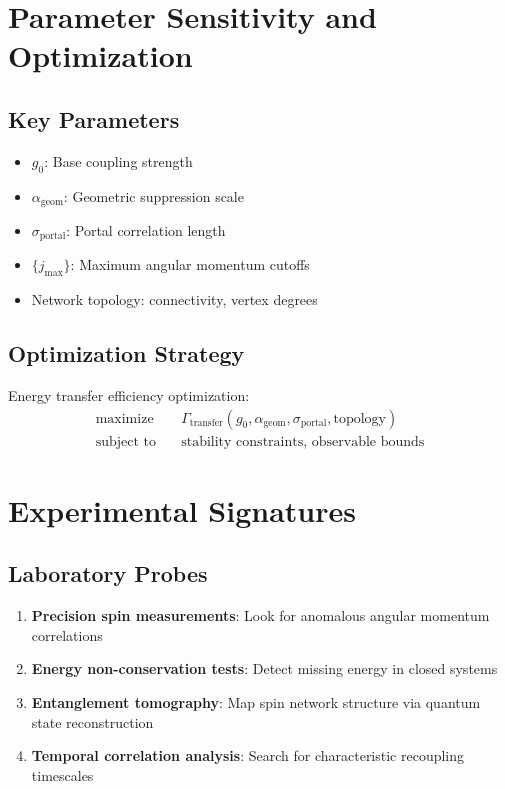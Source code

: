 \documentclass{article}
\begin{document}
\section{Parameter Sensitivity and Optimization}

\subsection{Key Parameters}

\begin{itemize}
\item $g_0$: Base coupling strength
\item $\alpha_{\text{geom}}$: Geometric suppression scale
\item $\sigma_{\text{portal}}$: Portal correlation length
\item $\{j_{\max}\}$: Maximum angular momentum cutoffs
\item Network topology: connectivity, vertex degrees
\end{itemize}

\subsection{Optimization Strategy}

Energy transfer efficiency optimization:
\begin{align}
\text{maximize} \quad &\Gamma_{\text{transfer}}(g_0, \alpha_{\text{geom}}, \sigma_{\text{portal}}, \text{topology}) \\
\text{subject to} \quad &\text{stability constraints, observable bounds}
\end{align}

\section{Experimental Signatures}

\subsection{Laboratory Probes}

\begin{enumerate}
\item \textbf{Precision spin measurements}: Look for anomalous angular momentum correlations
\item \textbf{Energy non-conservation tests}: Detect missing energy in closed systems
\item \textbf{Entanglement tomography}: Map spin network structure via quantum state reconstruction
\item \textbf{Temporal correlation analysis}: Search for characteristic recoupling timescales
\end{enumerate}
\end{document}
